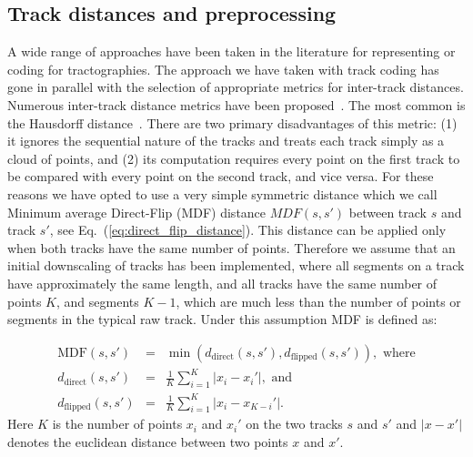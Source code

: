 \documentclass[preprint,authoryear,a4paper,10pt,onecolumn]{elsarticle}
\begin{document}
\subsection{\label{sub:track-distances}Track distances and preprocessing}

A wide range of approaches have been taken in the literature for
representing or coding for tractographies. The approach we have taken with track
coding has gone in parallel with the selection of appropriate metrics for
inter-track distances.  Numerous inter-track distance metrics have been
proposed~\citep{Ding2003, MaddahIPMI2007, zhang2005dti}. The most common is the
Hausdorff distance~\citep[and many other
studies]{corouge2004towards}. There are two primary disadvantages of
this metric: (1) it ignores the sequential nature of the tracks and
treats each track simply as a cloud of points, and (2) its computation
requires every point on the first track to be compared with every point
on the second track, and vice versa. For these reasons we have opted to
use a very simple symmetric distance \citep{EGMB10, Visser2010} which we
call Minimum average Direct-Flip (MDF) distance $MDF(s,s')$ between
track $s$ and track $s'$, see Eq.~(\ref{eq:direct_flip_distance}). This
distance can be applied only when both tracks have the same number of
points. Therefore we assume that an initial downscaling of tracks has
been implemented, where all segments on a track have approximately the
same length, and all tracks have the same number of points $K$, and segments
$K-1$, which are much less than the number of points or segments in the typical
raw track.  Under this assumption MDF is defined as:

\begin{eqnarray}
\textrm{MDF}(s,s') & = & \min(d_{\textrm{direct}}(s,s'),d_{\textrm{flipped}}(s,s')),\,\,\textrm{where}\label{eq:direct_flip_distance}\\
d_{\textrm{direct}}(s,s') & = & \frac{1}{K}\sum_{i=1}^{K}|x_{i}-x_{i}'|,\,\,\textrm{and}\nonumber\\
d_{\textrm{flipped}}(s,s') & = & \frac{1}{K}\sum_{i=1}^{K}|x_{i}-x_{K-i}'|.\nonumber
\end{eqnarray}
\noindent
Here $K$ is the number of points $x_{i}$ and $x_{i}'$ on the two tracks $s$ and $s'$
and $|x-x'|$ denotes the euclidean distance between two points $x$ and
$x'$.
\end{document}
